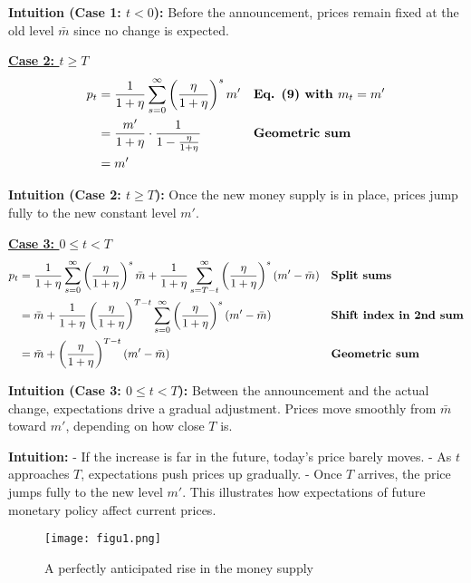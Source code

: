 \documentclass[12pt]{article}
\begin{document}
\textbf{Intuition (Case 1: $t<0$):} Before the announcement, prices remain fixed at the old level $\bar m$ since no change is expected.  


\noindent\underline{\textbf{Case 2: $t \geq T$}} \\[4pt]

\singlespacing
\begin{align}
p_t &= \frac{1}{1+\eta} \sum_{s=0}^\infty \left(\frac{\eta}{1+\eta}\right)^s m' && \text{\textbf{Eq. (9) with $m_t=m'$}} \\
    &= \frac{m'}{1+\eta} \cdot \frac{1}{1 - \frac{\eta}{1+\eta}} && \text{\textbf{Geometric sum}} \\
    &= m'
\end{align}

\textbf{Intuition (Case 2: $t \geq T$):} Once the new money supply is in place, prices jump fully to the new constant level $m'$.

\noindent\underline{\textbf{Case 3: $0 \leq t < T$}} \\[4pt]

\singlespacing
\begin{align}
p_t &= \frac{1}{1+\eta} \sum_{s=0}^\infty \left(\frac{\eta}{1+\eta}\right)^s \bar m 
    + \frac{1}{1+\eta} \sum_{s=T-t}^\infty \left(\frac{\eta}{1+\eta}\right)^s (m' - \bar m) && \text{\textbf{Split sums}} \\
    &= \bar m + \frac{1}{1+\eta}\left(\frac{\eta}{1+\eta}\right)^{T-t} \sum_{s=0}^\infty \left(\frac{\eta}{1+\eta}\right)^s (m' - \bar m) && \text{\textbf{Shift index in 2nd sum}} \\
    &= \bar m + \left(\frac{\eta}{1+\eta}\right)^{T-t} (m' - \bar m) && \text{\textbf{Geometric sum}}
\end{align}

\textbf{Intuition (Case 3: $0 \leq t < T$):} Between the announcement and the actual change, expectations drive a gradual adjustment. Prices move smoothly from $\bar m$ toward $m'$, depending on how close $T$ is.  

\textbf{Intuition:}  
- If the increase is far in the future, today’s price barely moves.  
- As $t$ approaches $T$, expectations push prices up gradually.  
- Once $T$ arrives, the price jumps fully to the new level $m'$.  
This illustrates how expectations of future monetary policy affect current prices.

\begin{figure}[H]
    \centering
    \texttt{[image: figu1.png]}
    \caption{A perfectly anticipated rise in the money supply}
\end{figure}
\end{document}
